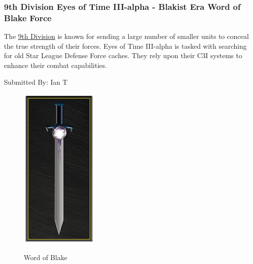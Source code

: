 \subsubsection{9th Division Eyes of Time III-alpha - Blakist Era Word of Blake Force}

The \href{https://www.sarna.net/wiki/9th_Division_(Word_of_Blake)}{9th Division} is known for sending a large number of smaller units to conceal the true strength of their forces.
Eyes of Time III-alpha is tasked with searching for old Star League Defense Force caches.
They rely upon their C3I systems to enhance their combat capabilities.

Submitted By: Ian T

\begin{figure}[!h]
  \centering
  \includegraphics[alt='Word of Blake Logo', width=1.5in, height=3.167in]{img/Word-of-Blake.png}
  \caption*{Word of Blake}
\end{figure}

